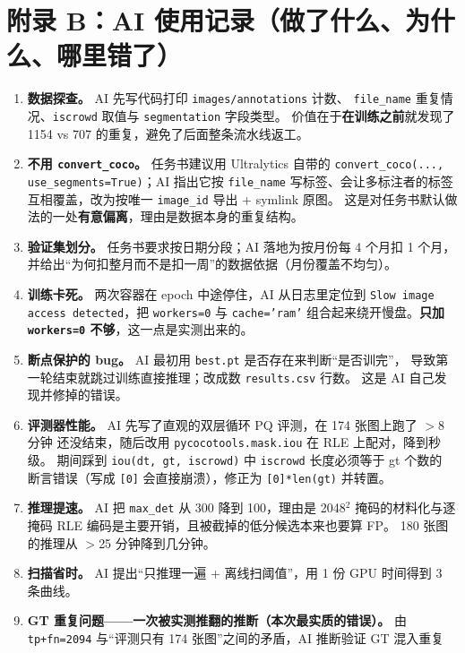 \documentclass{article}
\begin{document}
\section{附录 B：AI 使用记录（做了什么、为什么、哪里错了）}
\begin{enumerate}
  \item \textbf{数据探查。} AI 先写代码打印 \texttt{images/annotations} 计数、
        \texttt{file\_name} 重复情况、\texttt{iscrowd} 取值与 \texttt{segmentation} 字段类型。
        价值在于\textbf{在训练之前}就发现了 1154 vs 707 的重复，避免了后面整条流水线返工。
  \item \textbf{不用 \texttt{convert\_coco}。} 任务书建议用 Ultralytics 自带的
        \texttt{convert\_coco(..., use\_segments=True)}；AI 指出它按 \texttt{file\_name}
        写标签、会让多标注者的标签互相覆盖，改为按唯一 \texttt{image\_id} 导出 + symlink 原图。
        这是对任务书默认做法的一处\textbf{有意偏离}，理由是数据本身的重复结构。
  \item \textbf{验证集划分。} 任务书要求按日期分段；AI 落地为按月份每 4 个月扣 1 个月，
        并给出“为何扣整月而不是扣一周”的数据依据（月份覆盖不均匀）。
  \item \textbf{训练卡死。} 两次容器在 epoch 中途停住，AI 从日志里定位到
        \texttt{Slow image access detected}，把 \texttt{workers=0} 与 \texttt{cache='ram'}
        组合起来绕开慢盘。\textbf{只加 \texttt{workers=0} 不够}，这一点是实测出来的。
  \item \textbf{断点保护的 bug。} AI 最初用 \texttt{best.pt} 是否存在来判断“是否训完”，
        导致第一轮结束就跳过训练直接推理；改成数 \texttt{results.csv} 行数。
        这是 AI 自己发现并修掉的错误。
  \item \textbf{评测器性能。} AI 先写了直观的双层循环 PQ 评测，在 174 张图上跑了 $>$8 分钟
        还没结束，随后改用 \texttt{pycocotools.mask.iou} 在 RLE 上配对，降到秒级。
        期间踩到 \texttt{iou(dt, gt, iscrowd)} 中 \texttt{iscrowd} 长度必须等于 gt 个数的
        断言错误（写成 \texttt{[0]} 会直接崩溃），修正为 \texttt{[0]*len(gt)} 并转置。
  \item \textbf{推理提速。} AI 把 \texttt{max\_det} 从 300 降到 100，理由是
        2048$^2$ 掩码的材料化与逐掩码 RLE 编码是主要开销，且被截掉的低分候选本来也要算 FP。
        180 张图的推理从 $>$25 分钟降到几分钟。
  \item \textbf{扫描省时。} AI 提出“只推理一遍 + 离线扫阈值”，用 1 份 GPU 时间得到 3 条曲线。
  \item \textbf{GT 重复问题——一次被实测推翻的推断（本次最实质的错误）。} 由
        \texttt{tp+fn=2094} 与“评测只有 174 张图”之间的矛盾，AI 推断验证 GT 混入重复

\end{enumerate}
\end{document}
